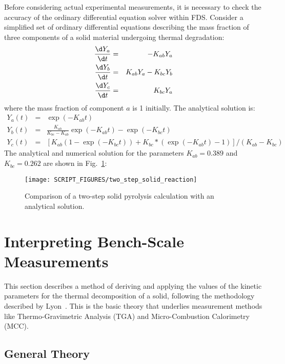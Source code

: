 \documentclass[11pt]{book}
\begin{document}
Before considering actual experimental measurements, it is necessary to check the accuracy of the ordinary differential
equation solver within FDS. Consider a simplified set  of ordinary  differential equations  describing the mass
fraction of three components of a solid material  undergoing thermal degradation:
\begin{eqnarray}
    \frac{\d Y_a}{\d t} &=&  -K_{ab} Y_a \nonumber  \\
    \frac{\d Y_b}{\d t} &=&   K_{ab} Y_a  -  K_{bc}  Y_b  \\
    \frac{\d Y_c}{\d t} &=&   K_{bc} Y_a
    \nonumber
\end{eqnarray}
where  the  mass  fraction  of  component  $a$  is  1  initially.  The
analytical solution is:
\begin{eqnarray}
    Y_a(t)    &=&    \exp(-K_{ab}t)    \nonumber   \\
    Y_b(t)    &=&    \frac{K_{ab}}{K_{bc}-K_{ab}} \exp(-K_{ab} t)  - \exp(-K_{bc} t) \\
    Y_c(t)    &=&    \left[   K_{ab}    (1-\exp(-K_{bc} t) )    +  K_{bc}*(\exp(-K_{ab} t) -1) \right] / (K_{ab}-K_{bc})
\end{eqnarray}
The analytical and  numerical solution for the parameters $K_{ab} = 0.389$ and $K_{bc} = 0.262$ are shown in Fig.~\ref{fig:two_step_solid_reaction}:

\begin{figure}[!htb]
\centering
\texttt{[image: SCRIPT\_FIGURES/two\_step\_solid\_reaction]}
\caption[The  test case]{Comparison of a two-step solid pyrolysis calculation with an analytical solution.}
\label{fig:two_step_solid_reaction}
\end{figure}




\section{Interpreting Bench-Scale Measurements}
\label{solid_kinetics}

This section describes a method of deriving and applying the values of the kinetic parameters for the thermal decomposition of a solid, following the methodology described by Lyon~\cite{Lyon:FM2000}. This is the basic theory that underlies measurement methods like Thermo-Gravimetric Analysis (TGA) and Micro-Combustion Calorimetry (MCC).


\subsection{General Theory}
\end{document}
